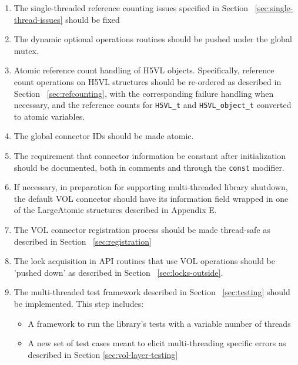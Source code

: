 \documentclass{article}
\begin{document}
\begin{enumerate}

    \item The single-threaded reference counting issues specified in Section ~\ref{sec:single-thread-issues} should be fixed

    \item The dynamic optional operations routines should be pushed under the global mutex.

    \item Atomic reference count handling of H5VL objects. Specifically, reference count operations on H5VL structures should be re-ordered as described in Section ~\ref{sec:refcounting}, with the corresponding failure handling when necessary, and the reference counts for \texttt{H5VL\_t} and \texttt{H5VL\_object\_t} converted to atomic variables.

    \item The global connector IDs should be made atomic.

    \item The requirement that connector information be constant after initialization should be documented, both in comments and through the \texttt{const} modifier.
    
    \item If necessary, in preparation for supporting multi-threaded library shutdown, the default VOL connector should have its information field wrapped in one of the LargeAtomic structures described in Appendix E.

    
    
    \item The VOL connector registration process should be made thread-safe as described in Section ~\ref{sec:registration}

    \item The lock acquisition in API routines that use VOL operations should be 'pushed down' as described in Section ~\ref{sec:locks-outside}.
    
    \item The multi-threaded test framework described in Section ~\ref{sec:testing} should be implemented. This step includes:

    \begin{itemize}
        \item A framework to run the library's tests with a variable number of threads

        \item A new set of test cases meant to elicit multi-threading specific errors as described in Section \ref{sec:vol-layer-testing} 


\end{itemize}
\end{enumerate}
\end{document}
